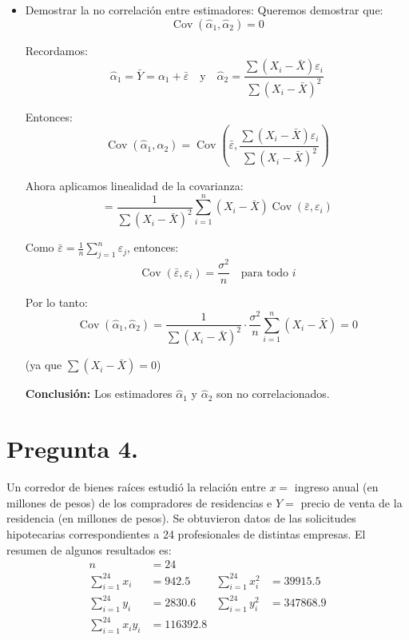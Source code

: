 \documentclass[12pt,a4paper]{article}
\begin{document}
\begin{itemize}
    
        \item [b)] Demostrar la no correlación entre estimadores:
        Queremos demostrar que:
        \[
        \operatorname{Cov}(\hat{\alpha}_1, \hat{\alpha}_2) = 0
        \]
        
        Recordamos:
        \[
        \hat{\alpha}_1 = \bar{Y} = \alpha_1 + \bar{\varepsilon}
        \quad \text{y} \quad
        \hat{\alpha}_2 = \frac{\sum (X_i - \bar{X})\varepsilon_i}{\sum (X_i - \bar{X})^2}
        \]
        
        Entonces:
        \[
        \operatorname{Cov}(\hat{\alpha}_1, \hat{\alpha}_2) = \operatorname{Cov}\left( \bar{\varepsilon}, \frac{\sum (X_i - \bar{X}) \varepsilon_i}{\sum (X_i - \bar{X})^2} \right)
        \]
        
        Ahora aplicamos linealidad de la covarianza:
        \[
        = \frac{1}{\sum (X_i - \bar{X})^2} \sum_{i=1}^n (X_i - \bar{X}) \operatorname{Cov}(\bar{\varepsilon}, \varepsilon_i)
        \]
        
        Como \( \bar{\varepsilon} = \frac{1}{n} \sum_{j=1}^n \varepsilon_j \), entonces:
        \[
        \operatorname{Cov}(\bar{\varepsilon}, \varepsilon_i) = \frac{\sigma^2}{n}
        \quad \text{para todo } i
        \]
        
        Por lo tanto:
        \[
        \operatorname{Cov}(\hat{\alpha}_1, \hat{\alpha}_2)
        = \frac{1}{\sum (X_i - \bar{X})^2} \cdot \frac{\sigma^2}{n} \sum_{i=1}^n (X_i - \bar{X}) = 0
        \]
        
        (ya que \( \sum (X_i - \bar{X}) = 0 \))
        
        \bigskip
        
        \textbf{Conclusión:} Los estimadores \( \hat{\alpha}_1 \) y \( \hat{\alpha}_2 \) son no correlacionados.
    \end{itemize}
    


\section*{Pregunta 4.}
Un corredor de bienes raíces estudió la relación entre $x =$ ingreso anual (en millones de pesos) de los compradores de residencias e $Y =$ precio de venta de la residencia (en millones de pesos). Se obtuvieron datos de las solicitudes hipotecarias correspondientes a 24 profesionales de distintas empresas. El resumen de algunos resultados es:
\begin{align*}
    n &= 24 \\
    \sum_{i=1}^{24}x_{i} &= 942.5 & \sum_{i=1}^{24}x_{i}^{2} &= 39915.5 \\
    \sum_{i=1}^{24}y_{i} &= 2830.6 & \sum_{i=1}^{24}y_{i}^{2} &= 347868.9 \\
    \sum_{i=1}^{24}x_{i}y_{i} &= 116392.8
\end{align*}
\end{document}
